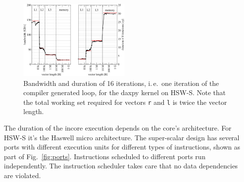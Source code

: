 \begin{figure}[tp]
  \centering
  \includegraphics[width=0.49\textwidth,clip=true]{images/daxpy-bw-hasep1-f-2.3-w-cy}
  \caption{Bandwidth and duration of 16 iterations, i.\,e.\ one iteration of the
compiler generated loop, for the daxpy kernel on HSW-S. Note that the total
working set required for vectors
\protect\texttt{r} and \texttt{l} is twice the vector length.}
  \label{fig:daxpy:perf}
\end{figure}

The duration of the incore execution depends on the core's architecture.
For HSW-S it's the Haswell micro architecture.
The super-scalar design has several ports with different execution units for
different types of instructions, shown as part of Fig.~\ref{fig:ports}.
Instructions scheduled to different ports run independently.
The instruction scheduler takes care that no data dependencies are violated.

